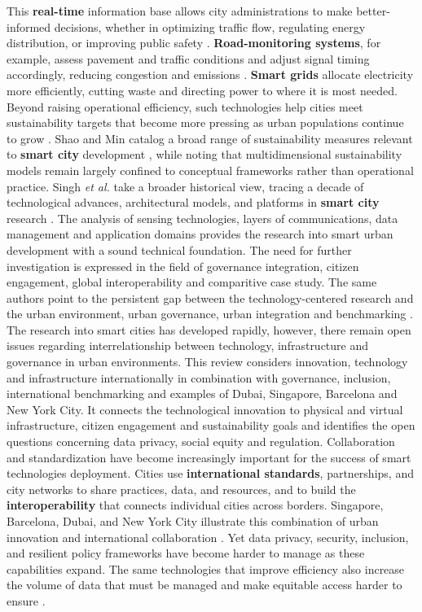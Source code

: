 \documentclass[pdflatex,sn-mathphys-num]{sn-jnl}%
\theoremstyle{thmstyleone}%
\theoremstyle{thmstyletwo}%
\theoremstyle{thmstylethree}%
\begin{document}
This \textbf{real-time} information base allows city administrations to make better-informed decisions, whether in optimizing traffic flow, regulating energy distribution, or improving public safety \cite{r1}. \textbf{Road-monitoring systems}, for example, assess pavement and traffic conditions and adjust signal timing accordingly, reducing congestion and emissions \cite{r3}. \textbf{Smart grids} allocate electricity more efficiently, cutting waste and directing power to where it is most needed. Beyond raising operational efficiency, such technologies help cities meet sustainability targets that become more pressing as urban populations continue to grow \cite{r4}. Shao and Min catalog a broad range of sustainability measures relevant to \textbf{smart city} development \cite{r107}, while noting that multidimensional sustainability models remain largely confined to conceptual frameworks rather than operational practice. Singh \emph{et al.} take a broader historical view, tracing a decade of technological advances, architectural models, and platforms in \textbf{smart city} research \cite{r108}. The analysis of sensing technologies, layers of communications, data management and
application domains provides the research into smart urban development with a sound
technical foundation. The need for further investigation is expressed in the field of
governance integration, citizen engagement, global interoperability and comparitive case study.
The same authors point to the persistent gap between the technology-centered
research and the urban environment, urban governance, urban integration and benchmarking
\cite{r7}.
The research into smart cities has developed rapidly, however, there remain open issues
regarding interrelationship between technology, infrastructure and governance in urban
environments. This review considers innovation, technology and infrastructure
internationally in combination with governance, inclusion, international benchmarking and
examples of Dubai, Singapore, Barcelona and New York City. It connects the technological
innovation to physical and virtual infrastructure, citizen engagement and sustainability
goals and identifies the open questions concerning data privacy, social equity and
regulation.
Collaboration and standardization have become increasingly important for the success
of smart technologies deployment. Cities use \textbf{international standards}, partnerships, and city networks to share practices, data, and resources, and to build the \textbf{interoperability} that connects individual cities across borders. Singapore, Barcelona, Dubai, and New York City illustrate this combination of urban innovation and international collaboration \cite{r8}. Yet data privacy, security, inclusion, and resilient policy frameworks have become harder to manage as these capabilities expand. The same technologies that improve efficiency also increase the volume of data that must be managed and make equitable access harder to ensure \cite{r9,r101}.
\end{document}
